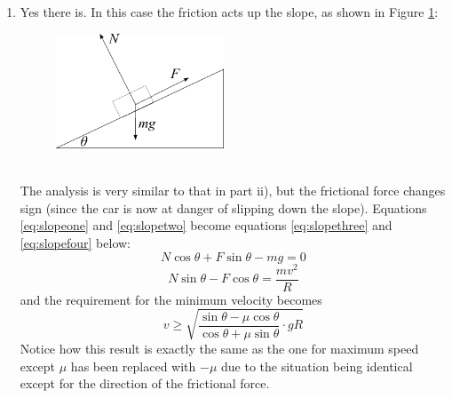 \begin{problem}
{\begin{enumerate}
\begin{enumerate}
\begin{equation*} v\le\sqrt{\frac{\sin\theta+\mu \cos\theta}{\cos\theta-\mu \sin\theta}\cdot gR} \end{equation*}
Notice how in the case $\theta=0$ this expression simplifies to the answer from part a), and similarly if $\mu=0$ the answer from part b) i).
\\
\item Yes there is. In this case the friction acts up the slope, as shown in Figure \ref{fig:CircularMotion_f}:
\begin{figure}[ht]
\centering
\includegraphics[width=5cm]{CircularMotion_f}
\caption{}
\label{fig:CircularMotion_f}
\end{figure}
\\
The analysis is very similar to that in part ii), but the frictional force changes sign (since the car is now at danger of slipping down the slope). Equations \eqref{eq:slopeone} and \eqref{eq:slopetwo} become equations \eqref{eq:slopethree} and \eqref{eq:slopefour} below:
\begin{equation}
 N\cos\theta+F\sin\theta-mg=0
\label{eq:slopethree}
\end{equation}
\begin{equation} 
N\sin\theta-F\cos\theta=\frac{mv^2}{R}
\label{eq:slopefour}
\end{equation}
and the requirement for the minimum velocity becomes
\begin{equation*}
v\ge\sqrt{\frac{\sin\theta-\mu \cos\theta}{\cos\theta+\mu \sin\theta}\cdot gR}
\end{equation*}
Notice how this result is exactly the same as the one for maximum speed except $\mu$ has been replaced with $-\mu$ due to the situation being identical except for the direction of the frictional force. 
\end{enumerate}
\end{enumerate}
}
\end{problem}